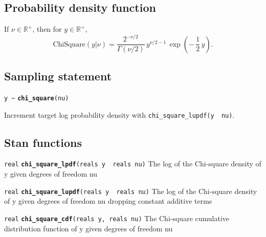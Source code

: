 \documentclass[
  10pt,
]{book}
\begin{document}
\hypertarget{probability-density-function-9}{%
\subsection{Probability density function}\label{probability-density-function-9}}

If \(\nu \in \mathbb{R}^+\), then for \(y \in \mathbb{R}^+\), \[
\text{ChiSquare}(y|\nu) = \frac{2^{-\nu/2}}     {\Gamma(\nu / 2)} \,
y^{\nu/2 - 1} \, \exp \! \left( -\, \frac{1}{2} \, y \right) . \]

\hypertarget{sampling-statement-33}{%
\subsection{Sampling statement}\label{sampling-statement-33}}

\texttt{y\ \textasciitilde{}} \textbf{\texttt{chi\_square}}\texttt{(nu)}

Increment target log probability density with \texttt{chi\_square\_lupdf(y\ \textbar{}\ nu)}.

\hypertarget{stan-functions-32}{%
\subsection{Stan functions}\label{stan-functions-32}}


\texttt{real} \textbf{\texttt{chi\_square\_lpdf}}\texttt{(reals\ y\ \textbar{}\ reals\ nu)}\newline
The log of the Chi-square density of y given degrees of freedom nu


\texttt{real} \textbf{\texttt{chi\_square\_lupdf}}\texttt{(reals\ y\ \textbar{}\ reals\ nu)}\newline
The log of the Chi-square density of y given degrees of freedom nu
dropping constant additive terms


\texttt{real} \textbf{\texttt{chi\_square\_cdf}}\texttt{(reals\ y,\ reals\ nu)}\newline
The Chi-square cumulative distribution function of y given degrees of
freedom nu
\end{document}
